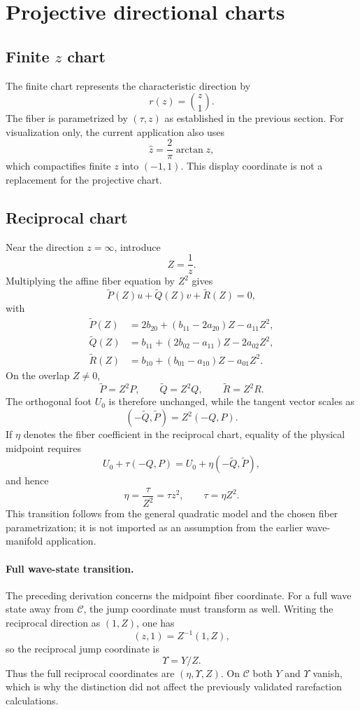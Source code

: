 \section{Projective directional charts}

\subsection{Finite $z$ chart}

The finite chart represents the characteristic direction by
\[
r(z)=\binom{z}{1}.
\]
The fiber is parametrized by $(\tau,z)$ as established in the previous section.
For visualization only, the current application also uses
\[
\widehat z=\frac{2}{\pi}\arctan z,
\]
which compactifies finite $z$ into $(-1,1)$. This display coordinate is not a replacement for the projective chart.

\subsection{Reciprocal chart}

Near the direction $z=\infty$, introduce
\[
Z=\frac1z.
\]
Multiplying the affine fiber equation by $Z^2$ gives
\[
\widetilde P(Z)u+\widetilde Q(Z)v+\widetilde R(Z)=0,
\]
with
\begin{align*}
\widetilde P(Z)&=2b_{20}+(b_{11}-2a_{20})Z-a_{11}Z^2,\\
\widetilde Q(Z)&=b_{11}+(2b_{02}-a_{11})Z-2a_{02}Z^2,\\
\widetilde R(Z)&=b_{10}+(b_{01}-a_{10})Z-a_{01}Z^2.
\end{align*}
On the overlap $Z\neq0$,
\[
\widetilde P=Z^2P,\qquad
\widetilde Q=Z^2Q,\qquad
\widetilde R=Z^2R.
\]
The orthogonal foot $U_0$ is therefore unchanged, while the tangent vector scales as
\[
(-\widetilde Q,\widetilde P)=Z^2(-Q,P).
\]
If $\eta$ denotes the fiber coefficient in the reciprocal chart, equality of the physical midpoint requires
\[
U_0+\tau(-Q,P)
 =U_0+\eta(-\widetilde Q,\widetilde P),
\]
and hence
\[
\boxed{\eta=\frac{\tau}{Z^2}=\tau z^2},
\qquad
\boxed{\tau=\eta Z^2}.
\]
This transition follows from the general quadratic model and the chosen fiber parametrization; it is not imported as an assumption from the earlier wave-manifold application.

\paragraph{Full wave-state transition.}
The preceding derivation concerns the midpoint fiber coordinate.  For a full
wave state away from $\mathcal C$, the jump coordinate must transform as well.
Writing the reciprocal direction as $(1,Z)$, one has
\[
 (z,1)=Z^{-1}(1,Z),
\]
so the reciprocal jump coordinate is
\[
 \boxed{\Upsilon=Y/Z}.
\]
Thus the full reciprocal coordinates are $(\eta,\Upsilon,Z)$.  On
$\mathcal C$ both $Y$ and $\Upsilon$ vanish, which is why the distinction did
not affect the previously validated rarefaction calculations.
